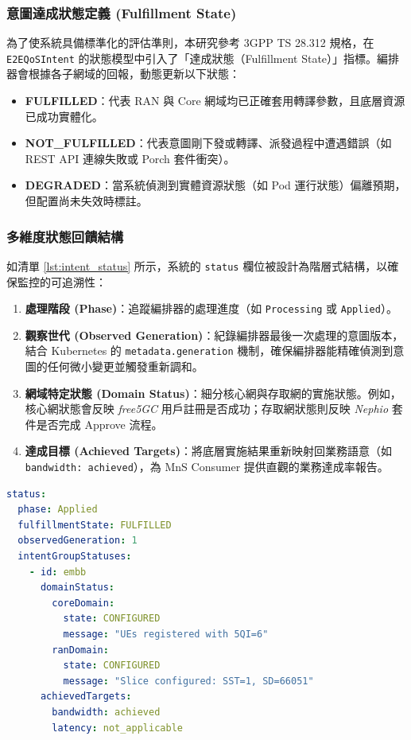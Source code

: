 \subsubsection{意圖達成狀態定義 (Fulfillment State)}
為了使系統具備標準化的評估準則，本研究參考 3GPP TS 28.312 規格，在 \texttt{E2EQoSIntent} 的狀態模型中引入了「達成狀態（Fulfillment State）」指標。編排器會根據各子網域的回報，動態更新以下狀態：
\begin{itemize}
    \item \textbf{FULFILLED}：代表 RAN 與 Core 網域均已正確套用轉譯參數，且底層資源已成功實體化。
    \item \textbf{NOT\_FULFILLED}：代表意圖剛下發或轉譯、派發過程中遭遇錯誤（如 REST API 連線失敗或 Porch 套件衝突）。
    \item \textbf{DEGRADED}：當系統偵測到實體資源狀態（如 Pod 運行狀態）偏離預期，但配置尚未失效時標註。
\end{itemize}

\subsubsection{多維度狀態回饋結構}
如清單 \ref{lst:intent_status} 所示，系統的 \texttt{status} 欄位被設計為階層式結構，以確保監控的可追溯性：
\begin{enumerate}
    \item \textbf{處理階段 (Phase)}：追蹤編排器的處理進度（如 \texttt{Processing} 或 \texttt{Applied}）。
    \item \textbf{觀察世代 (Observed Generation)}：紀錄編排器最後一次處理的意圖版本，結合 Kubernetes 的 \texttt{metadata.generation} 機制，確保編排器能精確偵測到意圖的任何微小變更並觸發重新調和。
    \item \textbf{網域特定狀態 (Domain Status)}：細分核心網與存取網的實施狀態。例如，核心網狀態會反映 \textit{free5GC} 用戶註冊是否成功；存取網狀態則反映 \textit{Nephio} 套件是否完成 Approve 流程。
    \item \textbf{達成目標 (Achieved Targets)}：將底層實施結果重新映射回業務語意（如 \texttt{bandwidth: achieved}），為 MnS Consumer 提供直觀的業務達成率報告。
\end{enumerate}

\begin{lstlisting}[language=yaml, caption={\texttt{E2EQoSIntent} 狀態回饋與監控資訊結構 (範例)}, label={lst:intent_status}]
status:
  phase: Applied
  fulfillmentState: FULFILLED
  observedGeneration: 1
  intentGroupStatuses:
    - id: embb
      domainStatus:
        coreDomain:
          state: CONFIGURED
          message: "UEs registered with 5QI=6"
        ranDomain:
          state: CONFIGURED
          message: "Slice configured: SST=1, SD=66051"
      achievedTargets:
        bandwidth: achieved
        latency: not_applicable
\end{lstlisting}

